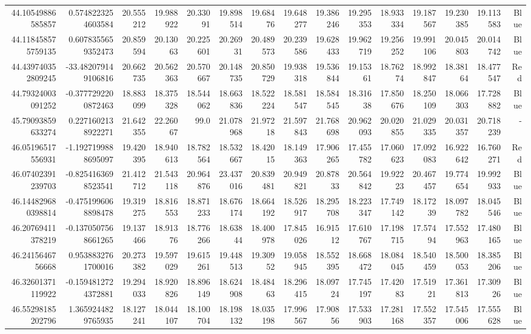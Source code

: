 \begin{center}
\begin{longtable}{rrrrrrrrrrrrrrr}
44.10549886585857 & 0.5748223254603584 & 20.555212 & 19.988922 & 20.33091 & 19.898514 & 19.68476 & 19.648277 & 19.386246 & 19.295353 & 18.933334 & 19.187567 & 19.230385 & 19.113583 & Blue \\
44.118458575759135 & 0.6078355659352473 & 20.859594 & 20.13063 & 20.225601 & 20.26931 & 20.489573 & 20.239586 & 19.628433 & 19.962719 & 19.256252 & 19.991106 & 20.045803 & 20.014742 & Blue \\
44.439740352809245 & -33.482079149106816 & 20.662735 & 20.562363 & 20.570667 & 20.148735 & 20.850729 & 19.938318 & 19.536844 & 19.15361 & 18.76274 & 18.992847 & 18.38164 & 18.477547 & Red \\
44.79324003091252 & -0.3777292200872463 & 18.883099 & 18.375328 & 18.544062 & 18.663836 & 18.522224 & 18.581547 & 18.584545 & 18.31638 & 17.850676 & 18.250109 & 18.066303 & 17.728882 & Blue \\
45.79093859633274 & 0.2271602138922271 & 21.642355 & 22.26067 & 99.0 & 21.078968 & 21.97218 & 21.597843 & 21.768698 & 20.962093 & 20.020855 & 21.029335 & 20.031357 & 20.718239 & - \\
46.05196517556931 & -1.1927199888695097 & 19.420395 & 18.940613 & 18.782564 & 18.532667 & 18.42015 & 18.149363 & 17.906265 & 17.455782 & 17.060623 & 17.092083 & 16.922642 & 16.760271 & Red \\
46.07402391239703 & -0.8254163698523541 & 21.412712 & 21.543118 & 20.964876 & 23.437016 & 20.839481 & 20.949821 & 20.87833 & 20.564842 & 19.92223 & 20.467457 & 19.774654 & 19.992933 & Blue \\
46.144829680398814 & -0.4751996068898478 & 19.319275 & 18.816553 & 18.871233 & 18.676174 & 18.664192 & 18.526917 & 18.295708 & 18.223347 & 17.749142 & 18.17239 & 18.097782 & 18.045546 & Blue \\
46.20769411378219 & -0.1370507568661265 & 19.137466 & 18.91376 & 18.776266 & 18.63844 & 18.400978 & 17.845026 & 16.91512 & 17.610767 & 17.198715 & 17.57494 & 17.552963 & 17.480165 & Blue \\
46.2415646756668 & 0.9538832761700016 & 20.273382 & 19.597029 & 19.615261 & 19.448513 & 19.30952 & 19.058945 & 18.552395 & 18.668472 & 18.084045 & 18.540459 & 18.500053 & 18.385206 & Blue \\
46.32601371119922 & -0.1594812724372881 & 19.294033 & 18.920826 & 18.896149 & 18.624908 & 18.48463 & 18.296415 & 18.09724 & 17.745197 & 17.42083 & 17.51921 & 17.361813 & 17.30926 & Blue \\
46.55298185202796 & 1.3659244829765935 & 18.127241 & 18.044107 & 18.100704 & 18.198132 & 18.035198 & 17.996567 & 17.90856 & 17.533903 & 17.281168 & 17.552357 & 17.545006 & 17.555628 & Blue \\

\end{longtable}
\end{center}

